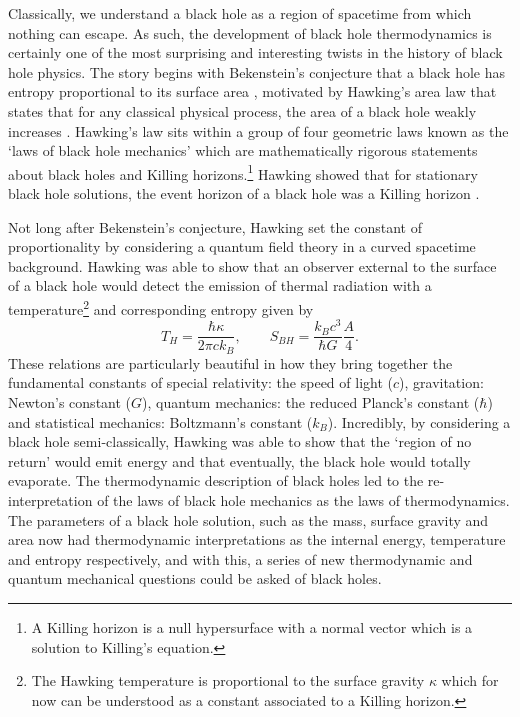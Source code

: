 Classically, we understand a black hole as a region of spacetime from which nothing can escape. As such, the development of black hole thermodynamics is certainly one of the most surprising and interesting twists in the history of black hole physics. The story begins with Bekenstein's conjecture that a black hole has entropy proportional to its surface area \cite{Bekenstein:1973ur}, motivated by Hawking's area law that states that for any classical physical process, the area of a black hole weakly increases \cite{Hawking:1971vc}. Hawking's law sits within a group of four geometric laws known as the `laws of black hole mechanics' which are mathematically rigorous statements about black holes and Killing horizons.\footnote{A Killing horizon is a null hypersurface with a normal vector which is a solution to Killing's equation.} Hawking showed that for stationary black hole solutions, the event horizon of a black hole was a Killing horizon \cite{Hawking:1973uf}.

Not long after Bekenstein's conjecture, Hawking set the constant of proportionality by considering a quantum field theory in a curved spacetime background. Hawking was able to show that an observer external to the surface of a black hole would detect the emission of thermal radiation \cite{Hawking:1974sw} with a temperature\footnote{The Hawking temperature is proportional to the surface gravity $\kappa$ which for now can be understood as a constant associated to a Killing horizon.} and corresponding entropy given by 
 \begin{equation*}
 	T_H = \frac{\hbar \kappa }{2 \pi c k_B}, \qquad S_{BH} = \frac{k_B c^3}{\hbar G} \frac{A}{4}.
 \end{equation*}
 These relations are particularly beautiful in how they bring together the fundamental constants of special relativity: the speed of light ($c$), gravitation: Newton's constant ($G$), quantum mechanics: the reduced Planck's constant ($\hbar$) and statistical mechanics: Boltzmann's constant ($k_B$). Incredibly, by considering a black hole semi-classically, Hawking was able to show that the `region of no return' would emit energy and that eventually, the black hole would totally evaporate. The thermodynamic description of black holes led to the re-interpretation of the laws of black hole mechanics as the laws of thermodynamics. The parameters of a black hole solution, such as the mass, surface gravity and area now had thermodynamic interpretations as the internal energy, temperature and entropy respectively, and with this, a series of new thermodynamic and quantum mechanical questions could be asked of black holes.
 
